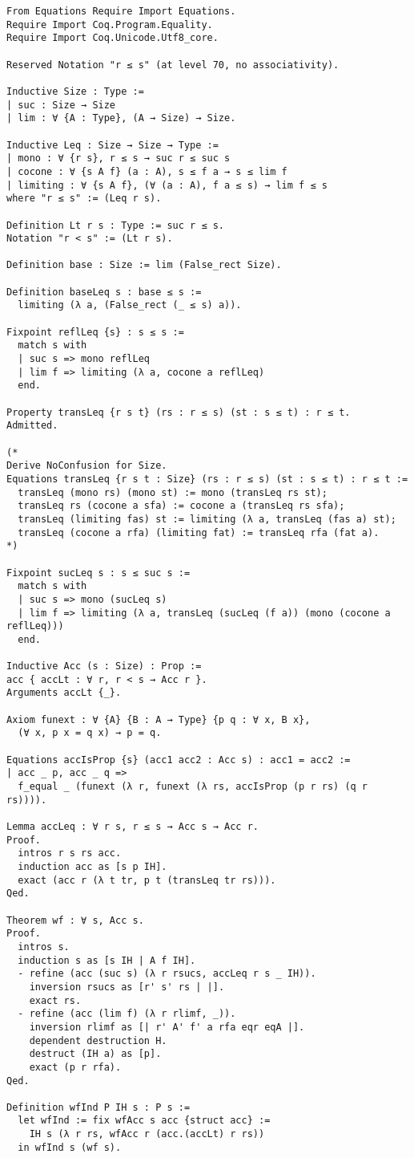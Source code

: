 \documentclass[acmsmall,review,anonymous]{acmart}\settopmatter{printfolios=true,printccs=false,printacmref=false}
\begin{document}
\begin{verbatim}
From Equations Require Import Equations.
Require Import Coq.Program.Equality.
Require Import Coq.Unicode.Utf8_core.

Reserved Notation "r ≤ s" (at level 70, no associativity).

Inductive Size : Type :=
| suc : Size → Size
| lim : ∀ {A : Type}, (A → Size) → Size.

Inductive Leq : Size → Size → Type :=
| mono : ∀ {r s}, r ≤ s → suc r ≤ suc s
| cocone : ∀ {s A f} (a : A), s ≤ f a → s ≤ lim f
| limiting : ∀ {s A f}, (∀ (a : A), f a ≤ s) → lim f ≤ s
where "r ≤ s" := (Leq r s).

Definition Lt r s : Type := suc r ≤ s.
Notation "r < s" := (Lt r s).

Definition base : Size := lim (False_rect Size).

Definition baseLeq s : base ≤ s :=
  limiting (λ a, (False_rect (_ ≤ s) a)).

Fixpoint reflLeq {s} : s ≤ s :=
  match s with
  | suc s => mono reflLeq
  | lim f => limiting (λ a, cocone a reflLeq)
  end.

Property transLeq {r s t} (rs : r ≤ s) (st : s ≤ t) : r ≤ t.
Admitted.

(*
Derive NoConfusion for Size.
Equations transLeq {r s t : Size} (rs : r ≤ s) (st : s ≤ t) : r ≤ t :=
  transLeq (mono rs) (mono st) := mono (transLeq rs st);
  transLeq rs (cocone a sfa) := cocone a (transLeq rs sfa);
  transLeq (limiting fas) st := limiting (λ a, transLeq (fas a) st);
  transLeq (cocone a rfa) (limiting fat) := transLeq rfa (fat a).
*)

Fixpoint sucLeq s : s ≤ suc s :=
  match s with
  | suc s => mono (sucLeq s)
  | lim f => limiting (λ a, transLeq (sucLeq (f a)) (mono (cocone a reflLeq)))
  end.

Inductive Acc (s : Size) : Prop :=
acc { accLt : ∀ r, r < s → Acc r }.
Arguments accLt {_}.

Axiom funext : ∀ {A} {B : A → Type} {p q : ∀ x, B x},
  (∀ x, p x = q x) → p = q.

Equations accIsProp {s} (acc1 acc2 : Acc s) : acc1 = acc2 :=
| acc _ p, acc _ q =>
  f_equal _ (funext (λ r, funext (λ rs, accIsProp (p r rs) (q r rs)))).

Lemma accLeq : ∀ r s, r ≤ s → Acc s → Acc r.
Proof.
  intros r s rs acc.
  induction acc as [s p IH].
  exact (acc r (λ t tr, p t (transLeq tr rs))).
Qed.

Theorem wf : ∀ s, Acc s.
Proof.
  intros s.
  induction s as [s IH | A f IH].
  - refine (acc (suc s) (λ r rsucs, accLeq r s _ IH)).
    inversion rsucs as [r' s' rs | |].
    exact rs.
  - refine (acc (lim f) (λ r rlimf, _)).
    inversion rlimf as [| r' A' f' a rfa eqr eqA |].
    dependent destruction H.
    destruct (IH a) as [p].
    exact (p r rfa).
Qed.

Definition wfInd P IH s : P s :=
  let wfInd := fix wfAcc s acc {struct acc} :=
    IH s (λ r rs, wfAcc r (acc.(accLt) r rs))
  in wfInd s (wf s).
\end{verbatim}
\end{document}
